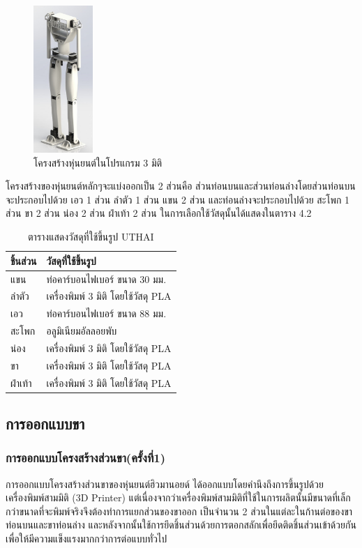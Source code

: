 \begin{figure}[h!]
    \centering
    \includegraphics[width=0.2\textwidth]{chapter4/images/UTHAI_ver_1.jpg}
    \caption{โครงสร้างหุ่นยนต์ในโปรแกรม 3 มิติ}
    \label{fig:UTHAI_ver_1}
\end{figure}

โครงสร้างของหุ่นยนต์หลักๆจะแบ่งออกเป็น 2 ส่วนคือ ส่วนท่อนบนและส่วนท่อนล่างโดยส่วนท่อนบนจะประกอบไปด้วย 
เอว 1 ส่วน ลำตัว 1 ส่วน แขน 2 ส่วน และท่อนล่างจะประกอบไปด้วย สะโพก 1 ส่วน ขา 2 ส่วน น่อง 2 ส่วน ฝ่าเท้า 2 ส่วน 
ในการเลือกใช้วัสดุนั้นได้แสดงในตาราง 4.2

\begin{table}[ht]
	\centering
	\begin{tabular}{| l | l |}
		\hline
		ชิ้นส่วน & วัสดุที่ใช้ขึ้นรูป \\
        \hline
        แขน	& ท่อคาร์บอนไฟเบอร์ ขนาด 30 มม. \\
        ลำตัว & เครื่องพิมพ์ 3 มิติ โดยใช้วัสดุ PLA \\
        เอว	& ท่อคาร์บอนไฟเบอร์ ขนาด 88 มม. \\
        สะโพก & อลูมิเนียมอัลลอยพับ \\
        น่อง & เครื่องพิมพ์ 3 มิติ โดยใช้วัสดุ PLA \\
        ขา & เครื่องพิมพ์ 3 มิติ โดยใช้วัสดุ PLA \\
        ฝ่าเท้า	& เครื่องพิมพ์ 3 มิติ โดยใช้วัสดุ PLA \\
	    \hline
	\end{tabular}
	\caption{ตารางแสดงวัสดุที่ใช้ขึ้นรูป UTHAI}
	\label{tab:UTHAI_material}
\end{table}

\clearpage
\subsection{การออกแบบขา}
\subsubsection*{การออกแบบโครงสร้างส่วนขา(ครั้งที่1)}
การออกแบบโครงสร้างส่วนขาของหุ่นยนต์ฮิวมานอยด์ ได้ออกแบบโดยคำนึงถึงการขึ้นรูปด้วยเครื่องพิมพ์สามมิติ (3D Printer) 
แต่เนื่องจากว่าเครื่องพิมพ์สามมิติที่ใช้ในการผลิตนั้นมีขนาดที่เล็กกว่าขนาดที่จะพิมพ์จริงจึงต้องทำการแยกส่วนของขาออก
เป็นจำนวน 2 ส่วนในแต่ละในก้านต่อของขาท่อนบนและขาท่อนล่าง และหลังจากนั้นใช้การยึดชิ้นส่วนด้วยการตอกสลักเพื่อยึดติดชิ้นส่วนเข้าด้วยกัน
เพื่อให้มีความแข็งแรงมากกว่าการต่อแบบทั่วไป

